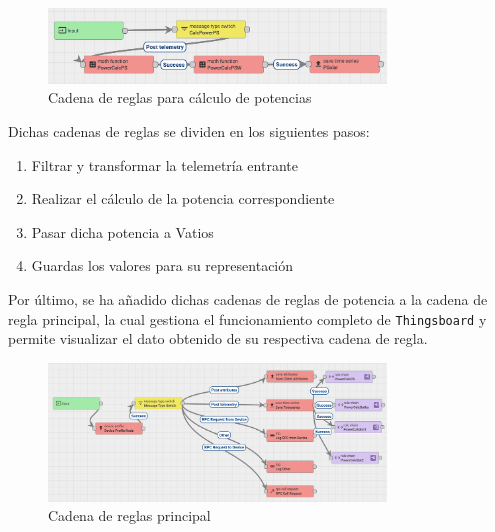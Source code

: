 \begin{figure}[H]
    \centering
    \includegraphics[width=0.8\textwidth]{images/3-software/3-2-2-thingsboard/CadenaPotencia.png}
    \caption{Cadena de reglas para cálculo de potencias}
    \label{fig:3-2-2-CadenaPotenciaThingsBoard}
\end{figure}

Dichas cadenas de reglas se dividen en los siguientes pasos:

\begin{enumerate}
    \item Filtrar y transformar la telemetría entrante
    \item Realizar el cálculo de la potencia correspondiente
    \item Pasar dicha potencia a Vatios
    \item Guardas los valores para su representación
\end{enumerate}

Por último, se ha añadido dichas cadenas de reglas de potencia a la cadena de regla principal, la cual gestiona el funcionamiento completo de \texttt{Thingsboard} y permite visualizar el dato obtenido de su respectiva cadena de regla.

\begin{figure}[H]
    \centering
    \includegraphics[width=0.8\textwidth]{images/3-software/3-2-2-thingsboard/CadenaPrincipal.png}
    \caption{Cadena de reglas principal}
    \label{fig:3-2-2-CadenaPrincipalThingsBoard}
\end{figure}

